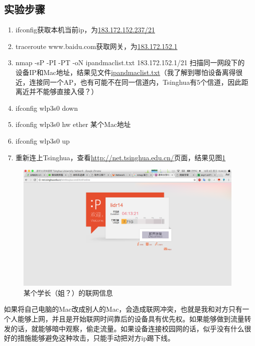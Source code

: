\documentclass[a4paper]{article}
\begin{document}
\subsection{实验步骤}
\begin{enumerate}
	\item ifconfig获取本机当前ip，为\uline{183.172.152.237/21}
	\item traceroute www.baidu.com获取网关，为\uline{183.172.152.1}
	\item nmap -sP -PI -PT -oN ipandmaclist.txt 183.172.152.1/21 扫描同一网段下的设备IP和Mac地址，结果见文件\uline{ipandmaclist.txt}（我了解到哪怕设备离得很近，连接同一个AP，也有可能不在同一信道内，Tsinghua有5个信道，因此距离近并不能够直接入侵？）
	\item ifconfig wlp3s0 down
	\item ifconfig wlp3s0 hw ether 某个Mac地址
	\item ifconfig wlp3s0 up
	\item 重新连上Tsinghua，查看\url{http://net.tsinghua.edu.cn/}页面，结果见图\ref{fig:4}
\end{enumerate}

\begin{figure}[htp]
\centering
\includegraphics[width=1.0\linewidth]{lidr14.png}
\caption{某个学长（姐？）的联网信息}
\label{fig:4}
\end{figure}

如果将自己电脑的Mac改成别人的Mac，会造成联网冲突，也就是我和对方只有一个人能够上网，并且是开始联网时间靠后的设备具有优先权。如果能够做到流量转发的话，就能够暗中观察，偷走流量。如果设备连接校园网的话，似乎没有什么很好的措施能够避免这种攻击，只能手动把对方ip踢下线。
\end{document}
